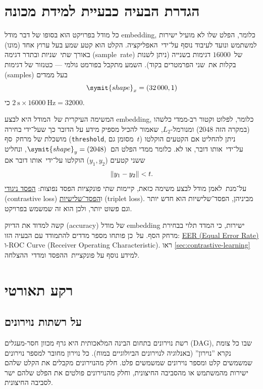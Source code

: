 \documentclass[hebrew, a4paper]{article}
\theoremstyle{plain}
\theoremstyle{definition}
\numberwithin{equation}{section}
\DeclarePairedDelimiter\norm{\lVert}{\rVert}
\begin{document}
\section{הגדרת הבעיה כבעיית למידת מכונה}
\label{sec:problem-as-ml}

כל מודל בפרויקט הוא בסופו של דבר מודל embedding, כלומר, הפלט שלו לא
מועיל ישירות למשתמש ונועד לעיבוד נוסף על־ידי~האפליקציה. הקלט הוא קטע
שמע בעל ערוץ אחד (מונו) באורך שתי~שניות ובתדר דגימה (sample~rate)
של~$\num{16000}$ דגימות בשנייה (ניתן לשנות בקלות את~שני הפרמטרים בקוד).
השמע מתקבל בפורמט גולמי --- כטנזור של דגימות (samples) בעל ממדים
\[
  \symit{shape}_x = (\num{32000}, 1)
\]
כי $\SI{2}{\s} \times \SI{16000}{\Hz} = \num{32000}$.

המשימה העיקרית של~המודל היא לבצע embedding, כלומר, לפלוט וקטור רב-ממדי
כלשהו (במקרה הזה $\num{2048}$) ומנורמל-$L_2$, שאמור להכיל מספיק מידע
על הדובר כך שעל־ידי בחירה מושכלת של מרחק~סף (\verb|threshold|, מסומן
גם~$t$) ניתן להחליט אם הקטעים הוקלטו על־ידי~אותו דובר, או לא. כלומר
ממדי הפלט הם~$\symit{shape}_y = (\num{2048})$, ונחליט ששני קטעים
($y_1,y_2$) הוקלטו על־ידי~אותו דובר אם
\[
  \norm{y_1 - y_2} < t.
\]
על־מנת~לאמן מודל לבצע משימה כזאת, קיימות שתי פונקציות הפסד נפוצות:
\hyperref[sec:contrastive-loss]{הפסד ניגודי} (contrastive loss)
ו\hyperref[sec:triplet-loss]{הפסד־שלישיות} (triplet loss). מביניהן,
הפסד־שלישיות הוא חדש יותר וגם פשוט יותר, ולכן הוא זה שמשמש בפרויקט.

קשה למדוד את הדיוק (accuracy) של מודל embedding ישירות, כי המדד תלוי
בבחירת מרחק הסף. על~כן פותחו מספר מדדים להתמודד עם הבעיה הזו:
\textenglish{\hyperref[defn:eer]{EER (Equal Error Rate)}}
ו-\textenglish{ROC Curve (Receiver Operating Characteristic)}. ראו
\autoref{sec:contrastive-learning} למידע נוסף על פונקציית~ההפסד
ומדדי~ההצלחה.

\section{רקע תאורטי}
\label{sec:theory}

\subsection{על רשתות נוירונים}
\label{sec:neural-networks}

רשת נוירונים בתחום הבינה המלאכותית היא גרף מכוון חסר-מעגלים (DAG), שבו
כל צומת נקרא ”נוירון” (באנלוגיה לנוירונים הביולוגיים במוח). כל נוירון
מחובר למספר נוירונים שמשמשים קלט ומספר נוירונים שמשמשים פלט. חלק
מהנוירונים מקבלים את הקלט שלהם ישירות מהמשתמש או מהסביבה החיצונית,
וחלק מהנוירונים פולטים את הפלט שלהם ישר לסביבה החיצונית.
\end{document}

